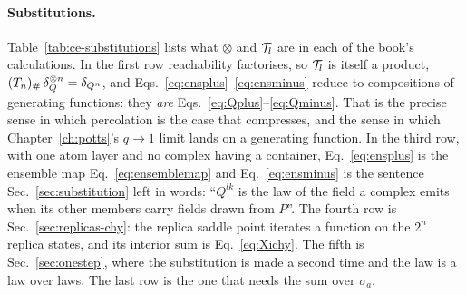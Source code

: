 \paragraph{Substitutions.} Table~\ref{tab:ce-substitutions} lists what
$\otimes$ and $\mathcal{T}_{l}$ are in each of the book's calculations. In the first
row reachability factorises, so $\mathcal{T}_{l}$ is itself a product,
$(T_{n})_{\#}\,\delta_{Q}^{\otimes n}=\delta_{Q^{n}}$, and
Eqs.~\eqref{eq:ensplus}--\eqref{eq:ensminus} reduce to compositions of
generating functions: they \emph{are} Eqs.~\eqref{eq:Qplus}--\eqref{eq:Qminus}.
That is the precise sense in which percolation is the case that compresses,
and the sense in which Chapter~\ref{ch:potts}'s $q\to1$ limit lands on a
generating function. In the third row, with one atom layer and no complex
having a container, Eq.~\eqref{eq:ensplus} is the ensemble map
Eq.~\eqref{eq:ensemblemap} and Eq.~\eqref{eq:ensminus} is the sentence
Sec.~\ref{sec:substitution} left in words: ``$Q^{lk}$ is the law of the field
a complex emits when its other members carry fields drawn from $P$''. The
fourth row is Sec.~\ref{sec:replicas-chy}: the replica saddle point iterates
a function on the $2^{n}$ replica states, and its interior sum is
Eq.~\eqref{eq:Xichy}. The fifth is Sec.~\ref{sec:onestep}, where the
substitution is made a second time and the law is a law over laws. The last
row is the one that needs the sum over $\sigma_{a}$.

